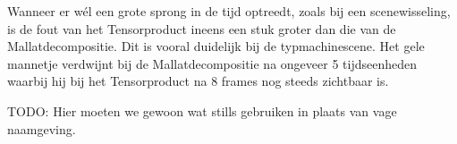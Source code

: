 Wanneer er w\'el een grote sprong in de tijd optreedt, zoals bij een scenewisseling, is de fout van het Tensorproduct ineens een stuk groter dan die van de Mallatdecompositie. Dit is vooral duidelijk bij de typmachinescene. Het gele mannetje verdwijnt bij de Mallatdecompositie na ongeveer 5 tijdseenheden waarbij hij bij het Tensorproduct na 8 frames nog steeds zichtbaar is.

TODO: Hier moeten we gewoon wat stills gebruiken in plaats van vage naamgeving.


